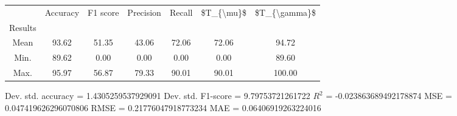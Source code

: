 \begin{tabular}{|c|c|c|c|c|c|c|}
\toprule
{} &  Accuracy &  F1 score &  Precision &  Recall &  \$T\_\{\textbackslash mu\}\$ &  \$T\_\{\textbackslash gamma\}\$ \\
Results &           &           &            &         &            &               \\
\hline
Mean    &     93.62 &     51.35 &      43.06 &   72.06 &      72.06 &         94.72 \\
Min.    &     89.62 &      0.00 &       0.00 &    0.00 &       0.00 &         89.60 \\
Max.    &     95.97 &     56.87 &      79.33 &   90.01 &      90.01 &        100.00 \\
\bottomrule
\end{tabular}

 Dev. std. accuracy = 1.4305259537929091
 Dev. std. F1-score = 9.79753721261722
 $R^2$ = -0.023863689492178874
 MSE = 0.047419626296070806
 RMSE = 0.21776047918773234
 MAE = 0.06406919263224016